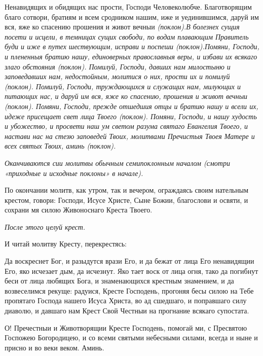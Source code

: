 Ненавидящих и обидящих нас прости, Господи Человеколюбче. Благотворящим благо сотвори, братиям и всем сродником нашим, иже и уединившимся, даруй им вся, яже ко спасению прошения и живот вечныи \itshape (поклон)\normalfont{}.В болезнех сущия посети и исцели, в темницах сущих свободи, по водам плавающим Правитель буди и иже в путех шествующим, исправи и поспеши \itshape (поклон)\normalfont{}.Помяни, Господи, и плененныя братию нашу, единоверных православныя веры, и избави их всякаго злаго обстояния \itshape (поклон)\normalfont{}. Помилуй, Господи, давших нам милостыню и заповедавших нам, недостойным, молитися о них, прости их и помилуй \itshape (поклон)\normalfont{}. Помилуй, Господи, труждающихся и служащих нам, милующих и питающих нас, и даруй им вся, яже ко спасению, прошения и живот вечныи \itshape (поклон)\normalfont{}. Помяни, Господи, прежде отшедшия отцы и братию нашу и всели их, идеже присещает свет лица Твоего \itshape (поклон)\normalfont{}. Помяни, Господи, и нашу худость и убожество, и просвети наш ум светом разума святаго Евангелия Твоего, и настави нас на стезю заповедей Твоих, молитвами Пречистыя Твоея Матере и всех святых Твоих, аминь \itshape (поклон)\normalfont{}.


\medskip


\itshape Оканчиваются сии молитвы обычным семипоклонным началом (смотри «приходные и исходные поклоны» в начале). \normalfont{}


\medskip


По окончании молитв, как утром, так и вечером, ограждаясь своим нательным крестом, говори: Господи, Исусе Христе, Сыне Божии, благослови и освяти, и сохрани мя силою Живоноснаго Креста Твоего. 


\medskip


\itshape После этого целуй крест.


И читай молитву Кресту, перекрестясь:\normalfont{}


Да воскреснет Бог, и разыдутся врази Его, и да бежат от лица Его ненавидящии Его, яко исчезает дым, да исчезнут. Яко тает воск от лица огня, тако да погибнут беси от лица любящих Бога, и знаменающихся крестным знамением, и да возвеселимся рекуще: радуися, Кресте Господень, прогоняя бесы силою на Тебе пропятаго Господа нашего Исуса Христа, во ад сшедшаго, и поправшаго силу диаволю, и давшаго нам Крест Свой Честныи на прогнание всякаго супостата.


О! Пречестныи и Животворящии Кресте Господень, помогай ми, с Пресвятою Госпожею Богородицею, и со всеми святыми небесными силами, всегда и ныне и присно и во веки веком. Аминь.


